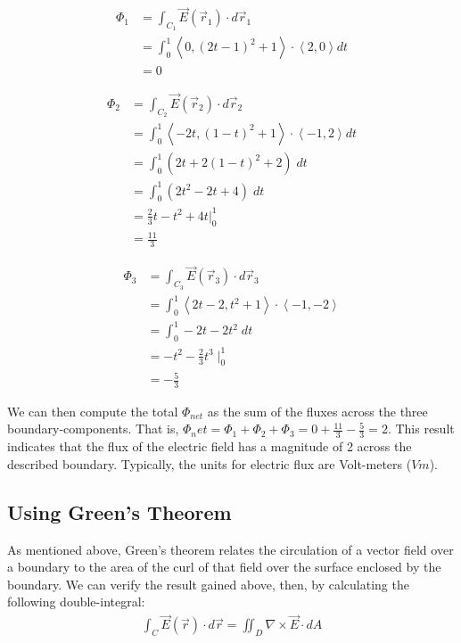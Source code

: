 \documentclass[11pt,English]{article}
\begin{document}
\begin{align*}
    \Phi_1 &= \int_{C_1} \vec{E}(\vec{r}_1) \cdot d\vec{r}_1 \\
    &= \int_0^1 \left<0, (2t-1)^2 +1\right> \cdot \left<2,0\right> dt \\
    &= 0
\end{align*}

\begin{align*}
    \Phi_2 &= \int_{C_2} \vec{E}(\vec{r}_2) \cdot d\vec{r}_2 \\
    &= \int_0^1 \left<-2t, (1-t)^2 +1\right> \cdot \left<-1,2\right> dt \\
    &= \int_0^1 (2t + 2(1-t)^2 +2) \; dt \\
    &= \int_0^1 (2t^2 -2t + 4) \; dt \\
    &= \frac{2}{3}t - t^2 + 4t \vert_0^1 \\
    &= \frac{11}{3}
\end{align*}

\begin{align*}
    \Phi_3 &= \int_{C_3} \vec{E}(\vec{r}_3) \cdot d\vec{r}_3 \\
    &= \int_0^1 \left<2t-2, t^2 +1\right> \cdot \left<-1, -2\right> \\
    &= \int_0^1 -2t-2t^2 \; dt \\
    &= -t^2 -\frac{2}{3}t^3 \mid_0^1 \\
    &= -\frac{5}{3}
\end{align*}

We can then compute the total $\Phi_{net}$ as the sum of the fluxes across the three boundary-components. That is, $\Phi_net = \Phi_1 + \Phi_2 + \Phi_3 = 0 + \frac{11}{3} - \frac{5}{3} = 2$. This result indicates that the flux of the electric field has a magnitude of 2 across the described boundary. Typically, the units for electric flux are Volt-meters ($Vm$).

\subsection{Using Green's Theorem}
As mentioned above, Green's theorem relates the circulation of a vector field over a boundary to the area of the curl of that field over the surface enclosed by the boundary. We can verify the result gained above, then, by calculating the following double-integral:
\begin{align*}
    \int_C \vec{E}(\vec{r}) \cdot d\vec{r} = \iint_D \nabla \times \vec{E} \cdot dA
\end{align*}
\end{document}

